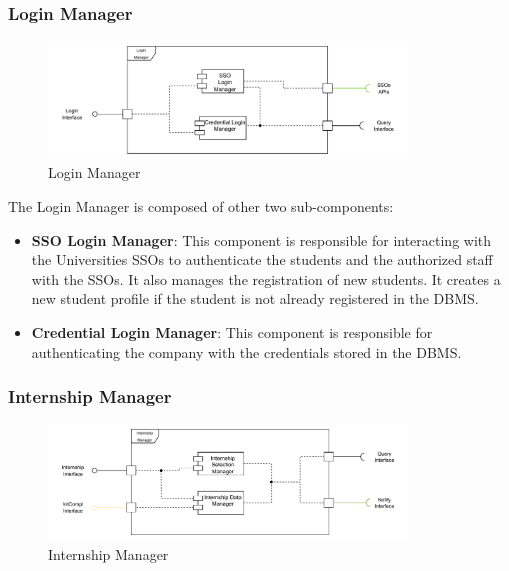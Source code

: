 \subsubsection{Login Manager}
\label{subsub:login-manager}%

\begin{figure}[H]
      \centering
      \includegraphics[width=0.85\textwidth]{Images/Login_Architecture.pdf}
      \caption{Login Manager}
      \label{login-manager-arch}
\end{figure}

\par The Login Manager is composed of other two sub-components:
\begin{itemize}
      \item \textbf{SSO Login Manager}: This component is responsible for interacting with the Universities SSOs to authenticate
            the students and the authorized staff with the SSOs. It also manages the registration of new students.
            It creates a new student profile if the student is not already registered in the DBMS.
      \item \textbf{Credential Login Manager}: This component is responsible for authenticating the company with the credentials
            stored in the DBMS.
\end{itemize}

\subsubsection{Internship Manager}
\label{subsub:internship-manager}%

\begin{figure}[H]
      \centering
      \includegraphics[width=0.85\textwidth]{Images/Internship_Architecture.pdf}
      \caption{Internship Manager}
      \label{internship-manager-arch}
\end{figure}

